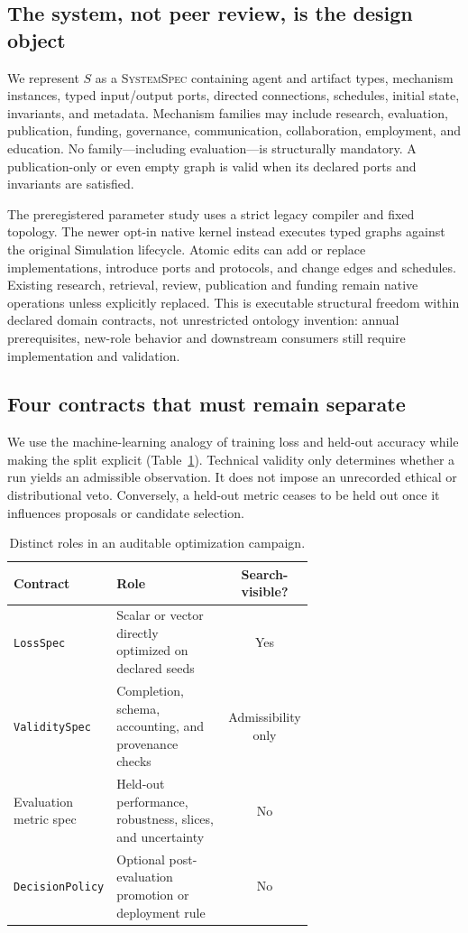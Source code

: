 \documentclass{article}
\newcommand{\systemspec}{\textsc{SystemSpec}}
\newcommand{\code}[1]{\texttt{#1}}
\begin{document}
\subsection{The system, not peer review, is the design object}

We represent $S$ as a \systemspec{} containing agent and artifact types, mechanism instances, typed input/output ports, directed connections, schedules, initial state, invariants, and metadata. Mechanism families may include research, evaluation, publication, funding, governance, communication, collaboration, employment, and education. No family---including evaluation---is structurally mandatory. A publication-only or even empty graph is valid when its declared ports and invariants are satisfied.

The preregistered parameter study uses a strict legacy compiler and fixed topology. The newer opt-in native kernel instead executes typed graphs against the original Simulation lifecycle. Atomic edits can add or replace implementations, introduce ports and protocols, and change edges and schedules. Existing research, retrieval, review, publication and funding remain native operations unless explicitly replaced. This is executable structural freedom within declared domain contracts, not unrestricted ontology invention: annual prerequisites, new-role behavior and downstream consumers still require implementation and validation.

\subsection{Four contracts that must remain separate}

We use the machine-learning analogy of training loss and held-out accuracy while making the split explicit (Table~\ref{tab:contracts}). Technical validity only determines whether a run yields an admissible observation. It does not impose an unrecorded ethical or distributional veto. Conversely, a held-out metric ceases to be held out once it influences proposals or candidate selection.

\begin{table}[t]
\caption{Distinct roles in an auditable optimization campaign.}
\label{tab:contracts}
\centering
\small
\begin{tabular}{p{0.23\linewidth}p{0.43\linewidth}c}
\toprule
Contract & Role & Search-visible? \\
\midrule
\code{LossSpec} & Scalar or vector directly optimized on declared seeds & Yes \\
\code{ValiditySpec} & Completion, schema, accounting, and provenance checks & Admissibility only \\
Evaluation metric spec & Held-out performance, robustness, slices, and uncertainty & No \\
\code{DecisionPolicy} & Optional post-evaluation promotion or deployment rule & No \\
\bottomrule
\end{tabular}
\end{table}
\end{document}
